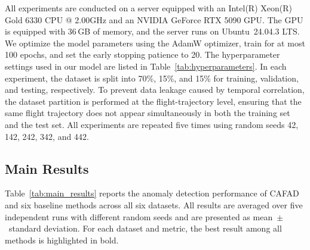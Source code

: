 \documentclass[iicol,pdflatex,sn-basic,Numbered]{sn-jnl}%
\theoremstyle{thmstyleone}%
\theoremstyle{thmstyletwo}%
\theoremstyle{thmstylethree}%
\begin{document}
All experiments are conducted on a server equipped with an Intel(R) Xeon(R) Gold 6330 CPU @ 2.00GHz and an NVIDIA GeForce RTX 5090 GPU.
The GPU is equipped with 36\,GB of memory, and the server runs on Ubuntu~24.04.3 LTS.
We optimize the model parameters using the AdamW optimizer, train for at most 100 epochs, and set the early stopping patience to 20.
The hyperparameter settings used in our model are listed in Table~\ref{tab:hyperparameters}.
In each experiment, the dataset is split into 70\%, 15\%, and 15\% for training, validation, and testing, respectively.
To prevent data leakage caused by temporal correlation, the dataset partition is performed at the flight-trajectory level, ensuring that the same flight trajectory does not appear simultaneously in both the training set and the test set.
All experiments are repeated five times using random seeds 42, 142, 242, 342, and 442.

\subsection{Main Results}

Table~\ref{tab:main_results} reports the anomaly detection performance of CAFAD and six baseline methods across all six datasets.
All results are averaged over five independent runs with different random seeds and are presented as mean~$\pm$~standard deviation.
For each dataset and metric, the best result among all methods is highlighted in bold.
\end{document}
